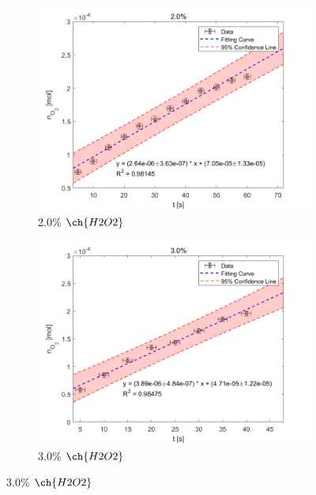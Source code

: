 \documentclass[%
 reprint,
 amsmath,amssymb,
 aps,
]{revtex4-2}
\begin{document}
\begin{figure}[htbp]
	\begin{subfigure}{0.4\textwidth}
		\includegraphics[width = 1\linewidth]{MOL_20.png}%
		\caption{\label{fig:MOL_20}2.0\% $\ch{H2O2}$}
	\end{subfigure}
	\begin{subfigure}{0.4\textwidth}
		\includegraphics[width = 1\linewidth]{MOL_30.png}%
		\caption{\label{fig:MOL_30}3.0\% $\ch{H2O2}$}
	\end{subfigure}


\end{figure}
\end{document}
